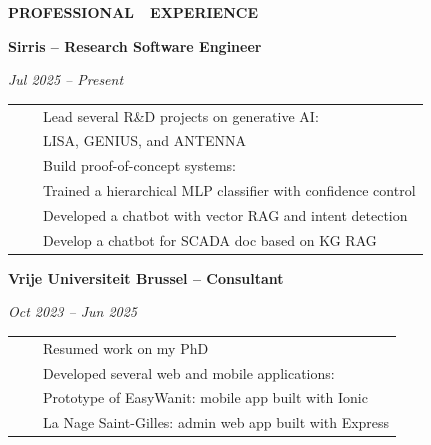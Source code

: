 \documentclass[a4paper,11pt,english]{article}
\newcommand{\MarginColumn}[0]{28pt}
\newcommand{\RightColumn}[0]{10.5cm}
\newcommand{\ItemSkip}[0]{4pt}
\newcommand{\SubItemSkip}[0]{0pt}
\newcommand{\Bullet}[0]{\faCaretRight~~}
\newcommand{\BeginSubRubricSkip}[0]{6pt}
\newcommand{\EndSubRubric}[0]{\vspace{4pt}}
\newcommand{\Rubric}[1]{\colorbox{gray!20}{\parbox{\linewidth}{\centering\sffamily\bfseries{}#1}}}
\newcommand{\SubRubric}[1]{\parbox{\linewidth}{\sffamily\bfseries{}#1}}
\begin{document}
\hspace{\MarginColumn}
\begin{minipage}[t]{\RightColumn}
\vspace{-18pt}\Rubric{\faBriefcase \quad PROFESSIONAL~~EXPERIENCE}\vspace{16pt}

\SubRubric{Sirris -- Research Software Engineer}
\emph{Jul 2025 -- Present} \\[\BeginSubRubricSkip]
\begin{tabularx}{\linewidth}{@{}l@{}l@{}}
\Bullet & Lead several R\&D projects on generative AI: \\[\SubItemSkip]
& \quad LISA, GENIUS, and ANTENNA \\[\ItemSkip]
\Bullet & Build proof-of-concept systems: \\[\SubItemSkip]
& \quad Trained a hierarchical MLP classifier with confidence control \\[\SubItemSkip]
& \quad Developed a chatbot with vector RAG and intent detection \\[\SubItemSkip]
& \quad Develop a chatbot for SCADA doc based on KG RAG \\[\SubItemSkip]
\end{tabularx}
\EndSubRubric{}

\SubRubric{Vrije Universiteit Brussel -- Consultant}
\emph{Oct 2023 -- Jun 2025} \\[\BeginSubRubricSkip]
\begin{tabularx}{\linewidth}{@{}l@{}l@{}}
\Bullet & Resumed work on my PhD \\[\ItemSkip]
\Bullet & Developed several web and mobile applications: \\[\SubItemSkip]
& \quad Prototype of EasyWanit: mobile app built with Ionic \\[\SubItemSkip]
& \quad La Nage Saint-Gilles: admin web app built with Express \\[\ItemSkip]
\end{tabularx}
\EndSubRubric{}


\end{minipage}
\end{document}

